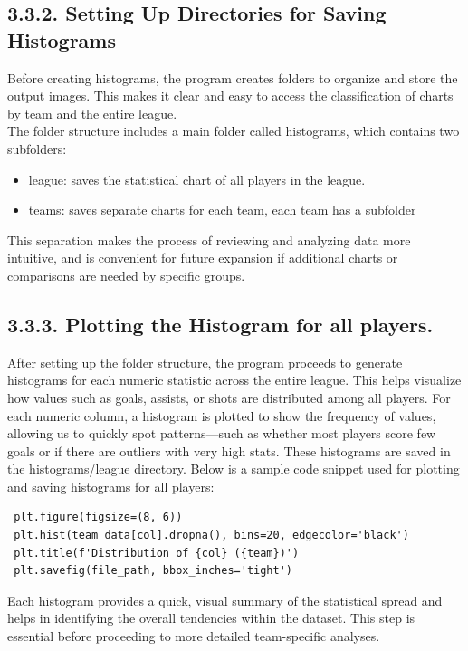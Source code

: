 \documentclass[a4paper,12pt]{article}
\begin{document}
\subsection*{\textbf{3.3.2. Setting Up Directories for Saving Histograms
}}
Before creating histograms, the program creates folders to organize and store the output images. This makes it clear and easy to access the classification of charts by team and the entire league.\\
The folder structure includes a main folder called histograms, which contains two subfolders:
\begin{itemize}
    \item league: saves the statistical chart of all players in the league.
    \item teams: saves separate charts for each team, each team has a subfolder
\end{itemize}
This separation makes the process of reviewing and analyzing data more intuitive, and is convenient for future expansion if additional charts or comparisons are needed by specific groups.
\subsection*{\textbf{3.3.3. Plotting the Histogram for all players.
}}
After setting up the folder structure, the program proceeds to generate histograms for each numeric statistic across the entire league. This helps visualize how values such as goals, assists, or shots are distributed among all players.
For each numeric column, a histogram is plotted to show the frequency of values, allowing us to quickly spot patterns—such as whether most players score few goals or if there are outliers with very high stats. These histograms are saved in the histograms/league directory.
Below is a sample code snippet used for plotting and saving histograms for all players:
\begin{mdframed}
\begin{verbatim}
 plt.figure(figsize=(8, 6))
 plt.hist(team_data[col].dropna(), bins=20, edgecolor='black')
 plt.title(f'Distribution of {col} ({team})')
 plt.savefig(file_path, bbox_inches='tight')
\end{verbatim}
\end{mdframed}
Each histogram provides a quick, visual summary of the statistical spread and helps in identifying the overall tendencies within the dataset. This step is essential before proceeding to more detailed team-specific analyses.
\end{document}
